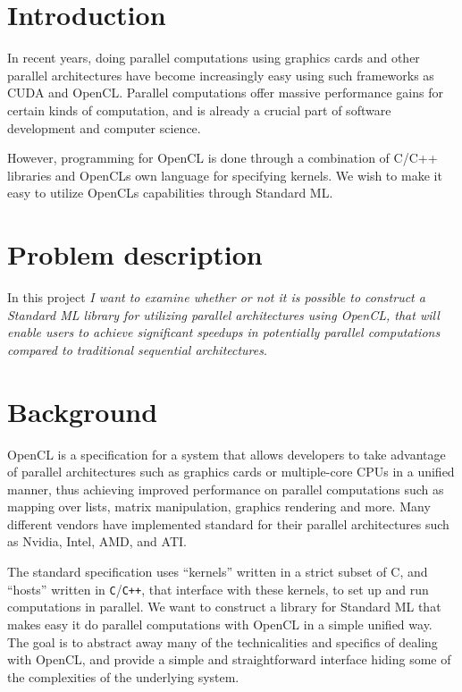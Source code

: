 \documentclass[a4paper, 10pt]{article}
\begin{document}
\maketitle

\newpage

\tableofcontents

\newpage

\section{Introduction}

In recent years, doing parallel computations using graphics cards and
other parallel architectures have become increasingly easy using such
frameworks as CUDA and OpenCL. Parallel computations offer massive
performance gains for certain kinds of computation, and is already a
crucial part of software development and computer science.

However, programming for OpenCL is done through a combination of C/C++
libraries and OpenCLs own language for specifying kernels. We wish to
make it easy to utilize OpenCLs capabilities through Standard ML.

\section{Problem description}

In this project \emph{I want to examine whether or not it is possible to
construct a Standard ML library for utilizing parallel architectures
using OpenCL, that will enable users to achieve significant speedups
in potentially parallel computations compared to traditional
sequential architectures}.

\section{Background}

OpenCL is a specification for a system that allows developers to take
advantage of parallel architectures such as graphics cards or
multiple-core CPUs in a unified manner, thus achieving improved
performance on parallel computations such as mapping over lists,
matrix manipulation, graphics rendering and more. Many different
vendors have implemented standard for their parallel architectures
such as Nvidia, Intel, AMD, and ATI.

The standard specification uses ``kernels'' written in a strict subset
of C, and ``hosts'' written in \verb+C+/\verb-C++-, that interface
with these kernels, to set up and run computations in parallel. We
want to construct a library for Standard ML that makes easy it do
parallel computations with OpenCL in a simple unified way. The goal is
to abstract away many of the technicalities and specifics of dealing
with OpenCL, and provide a simple and straightforward interface hiding
some of the complexities of the underlying system.
\end{document}
